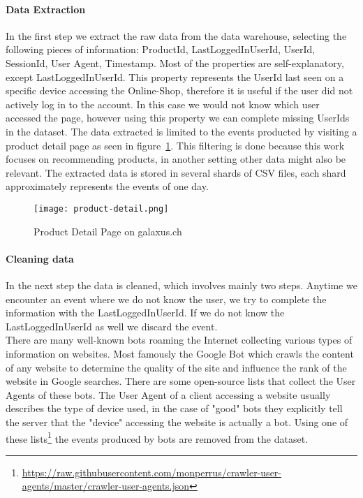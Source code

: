 \paragraph{Data Extraction}
In the first step we extract the raw data from the data warehouse, selecting the following pieces of information: ProductId, LastLoggedInUserId, UserId, SessionId, User Agent, Timestamp.
Most of the properties are self-explanatory, except LastLoggedInUserId.
This property represents the UserId last seen on a specific device accessing the Online-Shop, therefore it is useful if the user did not actively log in to the account.
In this case we would not know which user accessed the page, however using this property we can complete missing UserIds in the dataset.
The data extracted is limited to the events producted by visiting a product detail page as seen in figure~\ref{fig:product_detail}.
This filtering is done because this work focuses on recommending products, in another setting other data might also be relevant.
The extracted data is stored in several shards of CSV files, each shard approximately represents the events of one day.

\begin{figure}[ht]
	\centering
	\captionsetup{width=0.8\textwidth}
    \texttt{[image: product-detail.png]}
    \caption{Product Detail Page on galaxus.ch}
    \label{fig:product_detail}
\end{figure}

\paragraph{Cleaning data}
In the next step the data is cleaned, which involves mainly two steps.
Anytime we encounter an event where we do not know the user, we try to complete the information with the LastLoggedInUserId. 
If we do not know the LastLoggedInUserId as well we discard the event. \\
There are many well-known bots roaming the Internet collecting various types of information on websites.
Most famously the Google Bot which crawls the content of any website to determine the quality of the site and influence the rank of the website in Google searches.
There are some open-source lists that collect the User Agents of these bots.
The User Agent of a client accessing a website usually describes the type of device used, in the case of "good" bots they explicitly tell the server that the "device" accessing the website is actually a bot.
Using one of these lists\footnote{\url{https://raw.githubusercontent.com/monperrus/crawler-user-agents/master/crawler-user-agents.json}} the events produced by bots are removed from the dataset.
